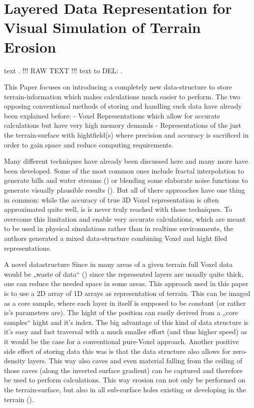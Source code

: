 \section{Layered Data Representation for Visual Simulation of Terrain Erosion}

text \cite{marechal2010heat}.
!!! RAW TEXT !!!
text to DEL: \cite{cordonnier2016large}.

This Paper focuses on introducing a completely new data-structure to store terrain-information which makes calculations much easier to perform. The two opposing conventional methods of storing and handling such data have already been explained before:
- Voxel Representations which allow for accurate calculations but have very high memory demands
- Representations of the just the terrain-surface with hightfield(s) where precision and accuracy is sacrificed in order to gain space and reduce computing requirements.

Many different techniques have already been discussed here and many more have been developed. Some of the most common ones include fractal interpolation to generate hills and water streams () or blending some elaborate noise functions to generate visually plausible results (). But all of there approaches have one thing in common: while the accuracy of true 3D Voxel representation is often approximated quite well, is is never truly reached with those techniques.
To overcome this limitation and enable very accurate calculations, which are meant to be used in physical simulations rather than in realtime environments, the authors generated a mixed data-structure combining Voxel and hight filed representations.

A novel datastructure
Since in many areas of a given terrain full Voxel data would be „waste  of data“ () since the represented layers are usually quite thick, one can reduce the needed space in some areas. This approach used in this paper is to use a 2D array of 1D arrays as representation of terrain. This can be  imaged as a core sample, where each layer in itself is supposed to be constant (or rather is’s parameters are). The hight of the position can easily derived from a „core samples“ hight and it’s index.
The big advantage of this kind of data structure is it’s easy and fast traversal with a much smaller effort (and thus higher speed) as it would be the case for a conventional pure-Voxel approach. Another positive side effect of storing data this was is that the data structure also allows for zero-density layers. This way also caves and even material falling from the ceiling of those caves (along the inverted surface gradient) can be captured and therefore be used to perform calculations. This way erosion can not only be performed on the terrain-surface, but also in all sub-surface holes existing or developing in the terrain ().

